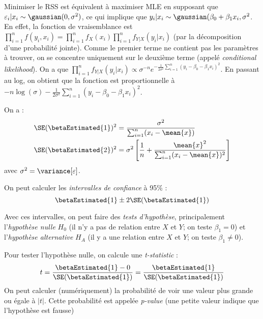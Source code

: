         \begin{remarque}
            Minimiser le RSS est équivalent à maximiser MLE en supposant que \(\varepsilon_i|x_i \sim  \gaussian(0, \sigma^2)\), ce qui implique que \(y_i|x_i \sim \gaussian(\beta_0 + \beta_1 x_i, \sigma^2\). En effet, la fonction de vraisemblance est \(\prod_{i=1}^n f(y_i, x_i) = \prod_{i=1}^n f_X(x_i) \prod_{i=1}^n f_{Y|X}(y_i|x_i)\) (par la décomposition d'une probabilité jointe). Comme le premier terme ne contient pas les paramètres à trouver, on se concentre uniquement sur le deuxième terme (appelé \textit{conditional likelihood}). On a que \(\prod_{i=1}^n f_{Y|X}(y_i|x_i) \propto \sigma^{-n}e^{-\frac{1}{2\sigma^2}\sum_{i=1}^n (y_i - \beta_0 - \beta_1x_i)^2}\). En passant au log, on obtient que la fonction est proportionnelle à \(-n\log(\sigma) - \frac{1}{2\sigma^2}\sum_{i=1}^n (y_i - \beta_0 - \beta_1x_i)^2\).
        \end{remarque}

        On a :
        \begin{align*}
            \SE(\betaEstimated{1})^2 &= \frac{\sigma^2}{\sum_{i=1}^n (x_i - \mean{x})}\\
            \SE(\betaEstimated{2})^2 &= \sigma^2 \left[\frac{1}{n} + \frac{\mean{x}^2}{\sum_{i=1}^n (x_i - \mean{x})^2}\right]
        \end{align*}
        avec \(\sigma^2 = \variance[\varepsilon]\).

        On peut calculer les \textit{intervalles de confiance} à 95\% :
        \[
            \betaEstimated{1} \pm 2\SE(\betaEstimated{1})
        \]

        Avec ces intervalles, on peut faire des \textit{tests d'hypothèse}, principalement l'\textit{hypothèse nulle} \(H_0\) (il n'y a pas de relation entre \(X\) et \(Y\); on teste \(\beta_1 = 0\)) et l'\textit{hypothèse alternative} \(H_A\) (il y a une relation entre \(X\) et \(Y\); on teste \(\beta_1 \not= 0\)).

        Pour tester l'hypothèse nulle, on calcule une \textit{t-statistic} :
        \[
            t = \frac{\betaEstimated{1} - 0}{\SE(\betaEstimated{1})} = \frac{\betaEstimated{1}}{\SE(\betaEstimated{1})}
        \]
        On peut calculer (numériquement) la probabilité de voir une valeur plus grande ou égale à \(|t|\). Cette probabilité est appelée \textit{p-value} (une petite valeur indique que l'hypothèse est fausse)
        
